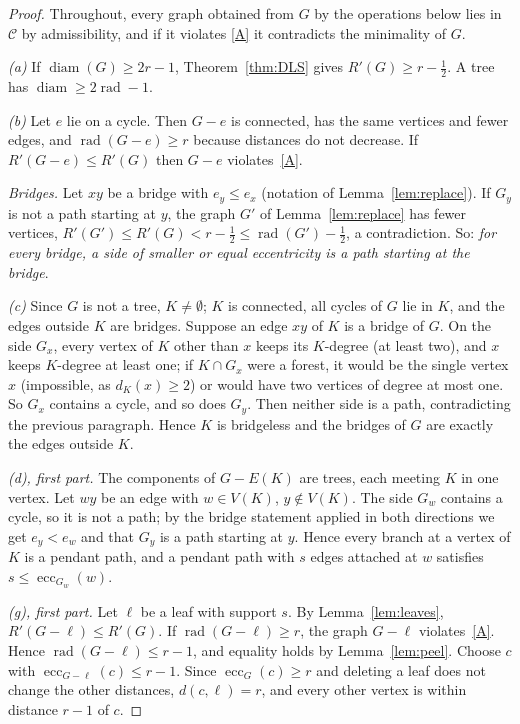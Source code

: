 \documentclass[11pt]{amsart}
\theoremstyle{definition}
\DeclareMathOperator{\rad}{rad}
\DeclareMathOperator{\diam}{diam}
\DeclareMathOperator{\ecc}{ecc}
\newcommand{\Rp}{R'}
\newcommand{\C}{\mathcal{C}}
\begin{document}
\begin{proof}
Throughout, every graph obtained from $G$ by the operations below lies in $\C$ by admissibility, and if it violates
\eqref{A} it contradicts the minimality of $G$.

\emph{(a)} If $\diam(G)\ge2r-1$, Theorem~\ref{thm:DLS} gives $\Rp(G)\ge r-\frac12$. A tree has $\diam\ge2\rad-1$.

\emph{(b)} Let $e$ lie on a cycle. Then $G-e$ is connected, has the same vertices and fewer edges, and
$\rad(G-e)\ge r$ because distances do not decrease. If $\Rp(G-e)\le\Rp(G)$ then $G-e$ violates~\eqref{A}.

\emph{Bridges.} Let $xy$ be a bridge with $e_y\le e_x$ (notation of Lemma~\ref{lem:replace}). If $G_y$ is not a path
starting at $y$, the graph $G'$ of Lemma~\ref{lem:replace} has fewer vertices, $\Rp(G')\le\Rp(G)<r-\frac12\le
\rad(G')-\frac12$, a contradiction. So: \emph{for every bridge, a side of smaller or equal eccentricity is a path
starting at the bridge}.

\emph{(c)} Since $G$ is not a tree, $K\neq\emptyset$; $K$ is connected, all cycles of $G$ lie in $K$, and the edges
outside $K$ are bridges. Suppose an edge $xy$ of $K$ is a bridge of $G$. On the side $G_x$, every vertex of $K$
other than $x$ keeps its $K$-degree (at least two), and $x$ keeps $K$-degree at least one; if $K\cap G_x$ were a
forest, it would be the single vertex $x$ (impossible, as $d_K(x)\ge2$) or would have two vertices of degree at most
one. So $G_x$ contains a cycle, and so does $G_y$. Then neither side is a path, contradicting the previous paragraph.
Hence $K$ is bridgeless and the bridges of $G$ are exactly the edges outside $K$.

\emph{(d), first part.} The components of $G-E(K)$ are trees, each meeting $K$ in one vertex. Let $wy$ be an edge
with $w\in V(K)$, $y\notin V(K)$. The side $G_w$ contains a cycle, so it is not a path; by the bridge statement
applied in both directions we get $e_y<e_w$ and that $G_y$ is a path starting at $y$. Hence every branch at a vertex of
$K$ is a pendant path, and a pendant path with $s$ edges attached at $w$ satisfies $s\le\ecc_{G_w}(w)$.

\emph{(g), first part.} Let $\ell$ be a leaf with support $s$. By Lemma~\ref{lem:leaves}, $\Rp(G-\ell)\le\Rp(G)$. If
$\rad(G-\ell)\ge r$, the graph $G-\ell$ violates~\eqref{A}. Hence $\rad(G-\ell)\le r-1$, and equality holds by
Lemma~\ref{lem:peel}. Choose $c$ with $\ecc_{G-\ell}(c)\le r-1$. Since $\ecc_G(c)\ge r$ and deleting a leaf does not
change the other distances, $d(c,\ell)=r$, and every other vertex is within distance $r-1$ of $c$.


\end{proof}
\end{document}
